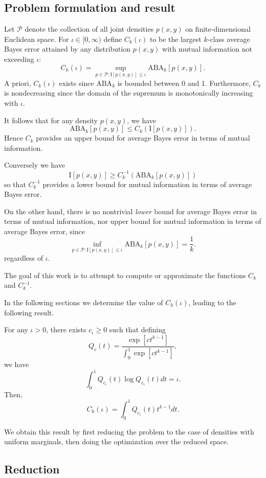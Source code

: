 \subsection{Problem formulation and result}

Let $\mathcal{P}$ denote the collection of all joint densities $p(x,
y)$ on finite-dimensional Euclidean space.  For $\iota \in [0,\infty)$
define $C_k(\iota)$ to be the largest $k$-class average Bayes error
attained by any distribution $p(x,y)$ with mutual information not
exceeding $\iota$:
\[
C_k(\iota) = \sup_{p \in \mathcal{P}: \text{I}[p(x,y)] \leq \iota} \text{ABA}_k[p(x,y)].
\]
A priori, $C_k(\iota)$ exists since $\text{ABA}_k$ is bounded between
0 and 1.  Furthermore, $C_k$ is nondecreasing since the domain of the
supremum is monotonically increasing with $\iota$.

It follows that for any density $p(x,
y)$, we have
\[
\text{ABA}_k[p(x,y)] \leq C_k(\text{I}[p(x,y)]).
\]
Hence $C_k$ provides an upper bound for average Bayes error in terms of mutual information.

Conversely we have
\[
\text{I}[p(x,y)] \geq C^{-1}_k(\text{ABA}_k[p(x,y)])
\]
so that $C^{-1}_k$ provides a lower bound for mutual information in terms of average Bayes error.

On the other hand, there is no nontrivial \emph{lower} bound for average Bayes error in terms of mutual information,
nor upper bound for mutual information in terms of average Bayes error, since
\[
\inf_{p \in \mathcal{P}: \text{I}[p(x,y)] \leq \iota} \text{ABA}_k[p(x,y)] = \frac{1}{k}.
\]
regardless of $\iota$.

The goal of this work is to attempt to compute or approximate the functions $C_k$ and $C_k^{-1}$.

In the following sections we determine the value of $C_k(\iota)$,
leading to the following result.

\begin{theorem}\label{theorem:Cunif}
For any $\iota > 0$, there exists $c_\iota \geq 0$ such that defining
\[
Q_c(t) = \frac{\exp[ct^{k-1}]}{\int_0^1 \exp[ct^{k-1}]},
\]
we have
\[
\int_0^1 Q_{c_\iota}(t) \log Q_{c_\iota}(t) dt = \iota.
\]
Then,
\[
C_k(\iota) = \int_0^1 Q_{c_\iota}(t) t^{k-1} dt.
\]
\end{theorem}

We obtain this result by first reducing the problem to the case of
densities with uniform marginals, then doing the optimization over the
reduced space.

\subsection{Reduction}

